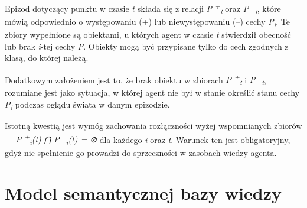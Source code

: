 Epizod dotyczący punktu w czasie \textit{t} składa się z relacji \textit{P\textsuperscript{ +}\textsubscript{i}} 
oraz 
\textit{P\textsuperscript{ --}\textsubscript{i}}, 
które mówią odpowiednio o występowaniu (+) lub niewystępowaniu (--) cechy
\textit{P\textsubscript{i}}. 
Te zbiory wypełnione są obiektami, u których agent w czasie \textit{t} stwierdził obecność lub brak \textit{i}-tej cechy \textit{P}. Obiekty mogą być przypisane tylko do cech zgodnych z klasą, do której należą. 

Dodatkowym założeniem jest to, że brak obiektu w zbiorach 
\textit{P\textsuperscript{ +}\textsubscript{i}} i 
\textit{P\textsuperscript{ --}\textsubscript{i}},  
rozumiane jest jako sytuacja, w której agent nie był w stanie określić stanu cechy 
\textit{P\textsubscript{i}} 
podczas oglądu świata w danym epizodzie.

Istotną kwestią jest wymóg zachowania rozłączności wyżej wspomnianych zbiorów --- 
\textit{P\textsuperscript{ +}\textsubscript{i}(t) ⋂ P\textsuperscript{ --}\textsubscript{i}(t) = ⊘} 
dla każdego \textit{i} oraz \textit{t}. Warunek ten jest obligatoryjny, gdyż nie spełnienie go prowadzi do sprzeczności w zasobach wiedzy agenta.

\section{Model semantycznej bazy wiedzy}







